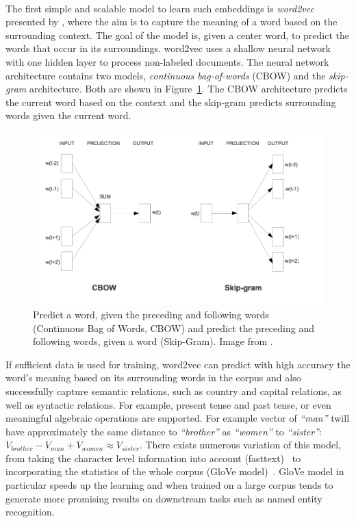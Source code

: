 \\
\noindent
The first simple and scalable model to learn such embeddings is \emph{word2vec} presented by , where the aim is to capture the meaning of a word based on the surrounding context. The goal of the model is, given a center word, to predict the words that occur in its surroundings. word2vec uses a shallow neural network with one hidden layer to process non-labeled documents. The neural network architecture contains two models, \emph{continuous bag-of-words} (CBOW) and the \emph{skip-gram} architecture. Both are shown in Figure~\ref{fig:skip_gram}. The CBOW architecture predicts the current word based on the context and the skip-gram predicts surrounding words given the current word.
\begin{figure}
\centering

\includegraphics[width=0.7\linewidth , height=0.5\linewidth]{images/CBOW_SkipGram.png}
\caption{Predict a word, given the preceding and following words (Continuous Bag of Words, CBOW) and predict the preceding and following words, given a word (Skip-Gram). Image from .}
\label{fig:skip_gram}
\end{figure}
If sufficient data is used for training, word2vec can predict with high accuracy the word's meaning based on its surrounding words in the corpus and also successfully capture semantic relations, such as country and capital relations, as well as syntactic relations. For example, present tense and past tense, or even meaningful algebraic operations are supported. For example vector of  \emph{``man''} twill have approximately the same distance to  \emph{``brother''} as \emph{``women''} to \emph{``sister''}: $V_{brother}-  V_{man} +V_{women} \approx V_{sister}$. There exists numerous variation of this model, from taking the character level information into account (fasttext)~ to incorporating the statistics of the whole corpus (GloVe model)~. GloVe model in particular speeds up the learning and when trained on a large corpus tends to generate more promising results on downstream tasks such as named entity recognition.\\
